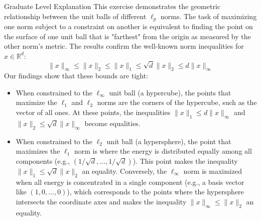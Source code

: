 \documentclass{article}
\begin{document}
\subsubsection*{\normalfont}{Graduate Level Explanation}
This exercise demonstrates the geometric relationship between the unit balls of different $\ell_p$ norms. The task of maximizing one norm subject to a constraint on another is equivalent to finding the point on the surface of one unit ball that is "farthest" from the origin as measured by the other norm's metric. The results confirm the well-known norm inequalities for $x \in \mathbb{R}^d$:
$$ \|x\|_{\infty} \le \|x\|_{2} \le \|x\|_{1} \le \sqrt{d}\|x\|_{2} \le d\|x\|_{\infty} $$
Our findings show that these bounds are tight:
\begin{itemize}
    \item When constrained to the $\ell_\infty$ unit ball (a hypercube), the points that maximize the $\ell_1$ and $\ell_2$ norms are the corners of the hypercube, such as the vector of all ones. At these points, the inequalities $\|x\|_1 \le d\|x\|_{\infty}$ and $\|x\|_2 \le \sqrt{d}\|x\|_{\infty}$ become equalities.
    \item When constrained to the $\ell_2$ unit ball (a hypersphere), the point that maximizes the $\ell_1$ norm is where the energy is distributed equally among all components (e.g., $(1/\sqrt{d}, \dots, 1/\sqrt{d})$). This point makes the inequality $\|x\|_1 \le \sqrt{d}\|x\|_2$ an equality. Conversely, the $\ell_\infty$ norm is maximized when all energy is concentrated in a single component (e.g., a basis vector like $(1, 0, \dots, 0)$), which corresponds to the points where the hypersphere intersects the coordinate axes and makes the inequality $\|x\|_{\infty} \le \|x\|_2$ an equality.
\end{itemize}
\end{document}
